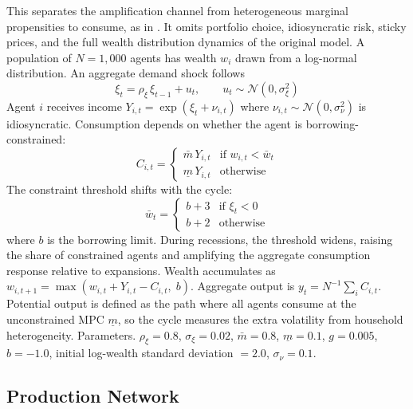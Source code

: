 \documentclass[10pt]{article}
\begin{document}
This separates the amplification channel from heterogeneous marginal propensities to consume, as in \citet{kaplan_etal2018}. It omits portfolio choice, idiosyncratic risk, sticky prices, and the full wealth distribution dynamics of the original model. A population of $N = 1{,}000$ agents has wealth $w_i$ drawn from a log-normal distribution. An aggregate demand shock follows
\begin{equation}
\xi_t = \rho_\xi \, \xi_{t-1} + u_t, \qquad u_t \sim \mathcal{N}(0, \sigma_\xi^2)
\end{equation}
Agent $i$ receives income $Y_{i,t} = \exp(\xi_t + \nu_{i,t})$ where $\nu_{i,t} \sim \mathcal{N}(0, \sigma_\nu^2)$ is idiosyncratic. Consumption depends on whether the agent is borrowing-constrained:
\begin{equation}
C_{i,t} = \begin{cases} \bar{m} \, Y_{i,t} & \text{if } w_{i,t} < \bar{w}_t \\ \underline{m} \, Y_{i,t} & \text{otherwise} \end{cases}
\end{equation}
The constraint threshold shifts with the cycle:
\begin{equation}
\bar{w}_t = \begin{cases} b + 3 & \text{if } \xi_t < 0 \\ b + 2 & \text{otherwise} \end{cases}
\end{equation}
where $b$ is the borrowing limit. During recessions, the threshold widens, raising the share of constrained agents and amplifying the aggregate consumption response relative to expansions. Wealth accumulates as $w_{i,t+1} = \max(w_{i,t} + Y_{i,t} - C_{i,t},\; b)$. Aggregate output is $y_t = N^{-1} \sum_i C_{i,t}$. Potential output is defined as the path where all agents consume at the unconstrained MPC $\underline{m}$, so the cycle measures the extra volatility from household heterogeneity. Parameters. $\rho_\xi = 0.8$, $\sigma_\xi = 0.02$, $\bar{m} = 0.8$, $\underline{m} = 0.1$, $g = 0.005$, $b = -1.0$, initial log-wealth standard deviation $= 2.0$, $\sigma_\nu = 0.1$.

\subsection*{Production Network}
\end{document}
